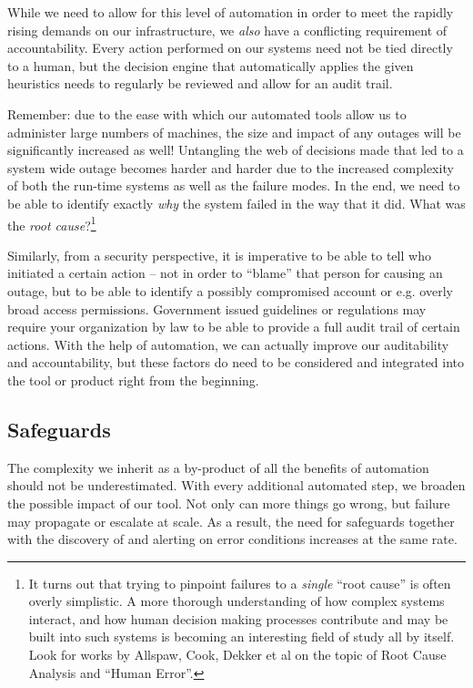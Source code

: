 While we need to allow for this level of automation in
order to meet the rapidly rising demands on our
infrastructure, we {\em also} have a conflicting
requirement of accountability.  Every action performed
on our systems need not be tied directly to a human,
but the decision engine that automatically applies the
given heuristics needs to regularly be reviewed and
allow for an audit trail.

Remember: due to the ease with which our automated
tools allow us to administer large numbers of
machines, the size and impact of any outages will be
significantly increased as well!  Untangling the web
of decisions made that led to a system wide outage
becomes harder and harder due to the increased
complexity of both the run-time systems as well as
the failure modes.  In the end, we need to be able to
identify exactly {\em why} the system failed in the
way that it did.  What was the {\em root
cause}?\footnote{It turns
out that trying to pinpoint failures to a {\em single}
``root cause'' is often overly simplistic.  A more
thorough understanding of how complex systems
interact, and how human decision making processes
contribute and may be built into such systems is
becoming an interesting field of study all by
itself.  Look for works by
Allspaw,
Cook,
Dekker et al on the topic
of Root Cause Analysis and ``Human Error''.}

Similarly, from a security perspective, it is
imperative to be able to tell who initiated a certain
action -- not in order to ``blame'' that person for
causing an outage, but to be able to identify a
possibly compromised account or e.g. overly broad access
permissions.  Government issued
guidelines or regulations
may require your organization by law to be able to
provide a full audit trail of certain actions.  With
the help of automation, we can actually improve our
auditability and accountability, but these factors do
need to be considered and integrated into the tool or
product right from the beginning.

\subsection{Safeguards}
\label{automation:pitfalls:safeguards}

The complexity we inherit as a by-product of all the
benefits of automation should not be underestimated.
With every additional automated step, we broaden the
possible impact of our tool.  Not only can more things
go wrong, but failure may propagate or escalate at
scale.  As a result, the need for safeguards together
with the discovery of and alerting on error conditions
increases at the same rate.

